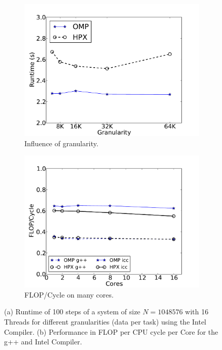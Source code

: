 \documentclass[10pt]{elsarticle}
\begin{document}
\begin{figure}
 \begin{subfigure}[b]{0.49\textwidth}
  \centering
  \includegraphics[width=\textwidth]{ariel_granularity.pdf}
  \caption{Influence of granularity.}
  \label{fig:granularity_ariel_1024K}
 \end{subfigure}
 \begin{subfigure}[b]{0.49\textwidth}
  \centering
  \includegraphics[width=\textwidth]{ariel_flops.pdf}
  \caption{FLOP/Cycle on many cores.}
 \end{subfigure}
 \caption{(a) Runtime of 100 steps of a system of size $N=1048576$ with 16 Threads for different granularities (data per task) using the Intel Compiler. (b) Performance in FLOP per CPU cycle per Core for the g++ and Intel Compiler.} 
 \label{fig:ariel_flops}
\end{figure}
\end{document}
